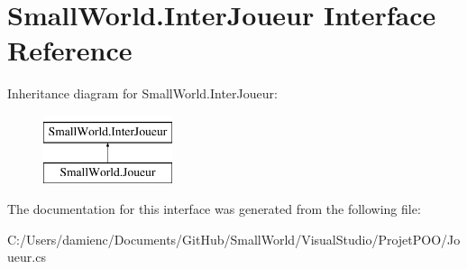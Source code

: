 \hypertarget{interface_small_world_1_1_inter_joueur}{\section{Small\-World.\-Inter\-Joueur Interface Reference}
\label{interface_small_world_1_1_inter_joueur}
}
Inheritance diagram for Small\-World.\-Inter\-Joueur\-:\begin{figure}[H]
\begin{center}
\leavevmode
\includegraphics[height=2.000000cm]{interface_small_world_1_1_inter_joueur}
\end{center}
\end{figure}


The documentation for this interface was generated from the following file\-:\begin{DoxyCompactItemize}
\item 
C\-:/\-Users/damienc/\-Documents/\-Git\-Hub/\-Small\-World/\-Visual\-Studio/\-Projet\-P\-O\-O/Joueur.\-cs\end{DoxyCompactItemize}
